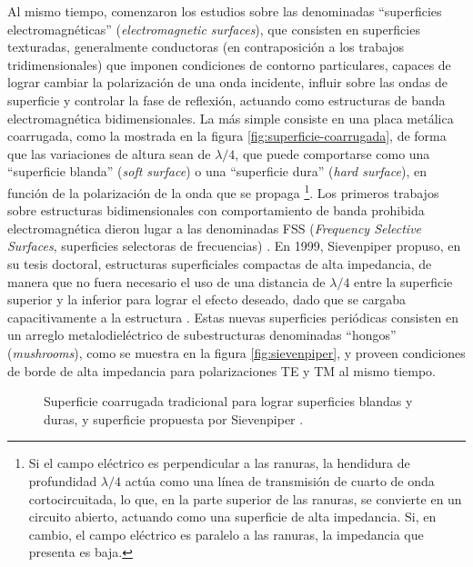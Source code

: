 Al mismo tiempo, comenzaron los estudios sobre las denominadas \enquote{superficies electromagnéticas} (\textit{electromagnetic surfaces}), que consisten en superficies texturadas, generalmente conductoras (en contraposición a los trabajos tridimensionales) que imponen condiciones de contorno particulares, capaces de lograr cambiar la polarización de una onda incidente, influir sobre las ondas de superficie y controlar la fase de reflexión, actuando como estructuras de banda electromagnética bidimensionales. La más simple consiste en una placa metálica coarrugada, como la mostrada en la figura \ref{fig:superficie-coarrugada}, de forma que las variaciones de altura sean de $\lambda/4$, que puede comportarse como una \enquote{superficie blanda} (\textit{soft surface}) o una \enquote{superficie dura} (\textit{hard surface}), en función de la polarización de la onda que se propaga \footnote{Si el campo eléctrico es perpendicular a las ranuras, la hendidura de profundidad $\lambda/4$ actúa como una línea de transmisión de cuarto de onda cortocircuitada, lo que, en la parte superior de las ranuras, se convierte en un circuito abierto, actuando como una superficie de alta impedancia. Si, en cambio, el campo eléctrico es paralelo a las ranuras, la impedancia que presenta es baja.}. Los primeros trabajos sobre estructuras bidimensionales con comportamiento de banda prohibida electromagnética dieron lugar a las denominadas FSS (\textit{Frequency Selective Surfaces}, superficies selectoras de frecuencias) \cite{Munk:libro}. En 1999, Sievenpiper \cite{Sievenpiper:Thesis} propuso, en su tesis doctoral, estructuras superficiales compactas de alta impedancia, de manera que no fuera necesario el uso de una distancia de $\lambda/4$ entre la superficie superior y la inferior para lograr el efecto deseado, dado que se cargaba capacitivamente a la estructura \cite{Marcela:Tesis} \cite{Sievenpiper:HIESForbiddenBand}. Estas nuevas superficies periódicas consisten en un arreglo metalodieléctrico de subestructuras denominadas \enquote{hongos} (\textit{mushrooms}), como se muestra en la figura \ref{fig:sievenpiper}, y proveen condiciones de borde de alta impedancia para polarizaciones TE y TM al mismo tiempo.

\begin{figure}[htp]
	\centering 
	\hspace{30pt}
	\caption{Superficie coarrugada tradicional para lograr superficies blandas y duras, y superficie propuesta por Sievenpiper \cite{Sievenpiper:Thesis}.}
	\label{fig:sievenpiper-comparacion}
\end{figure}

